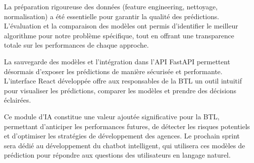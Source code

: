 La préparation rigoureuse des données (feature engineering, nettoyage, normalisation) a été essentielle pour garantir la qualité des prédictions. L'évaluation et la comparaison des modèles ont permis d'identifier le meilleur algorithme pour notre problème spécifique, tout en offrant une transparence totale sur les performances de chaque approche.

La sauvegarde des modèles et l'intégration dans l'API FastAPI permettent désormais d'exposer les prédictions de manière sécurisée et performante. L'interface React développée offre aux responsables de la BTL un outil intuitif pour visualiser les prédictions, comparer les modèles et prendre des décisions éclairées.

Ce module d'IA constitue une valeur ajoutée significative pour la BTL, permettant d'anticiper les performances futures, de détecter les risques potentiels et d'optimiser les stratégies de développement des agences. Le prochain sprint sera dédié au développement du chatbot intelligent, qui utilisera ces modèles de prédiction pour répondre aux questions des utilisateurs en langage naturel.